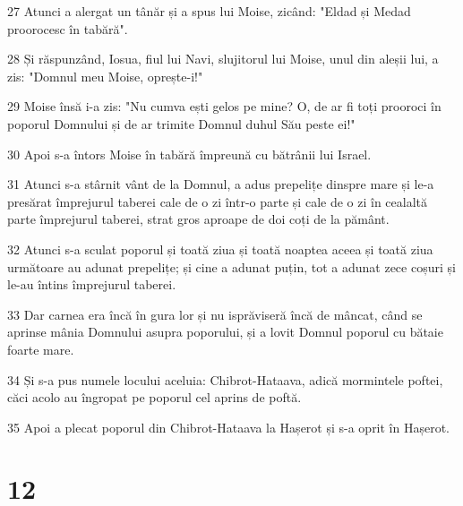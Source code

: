 \par 27 Atunci a alergat un tânăr și a spus lui Moise, zicând: "Eldad și Medad proorocesc în tabără".
\par 28 Și răspunzând, Iosua, fiul lui Navi, slujitorul lui Moise, unul din aleșii lui, a zis: "Domnul meu Moise, oprește-i!"
\par 29 Moise însă i-a zis: "Nu cumva ești gelos pe mine? O, de ar fi toți prooroci în poporul Domnului și de ar trimite Domnul duhul Său peste ei!"
\par 30 Apoi s-a întors Moise în tabără împreună cu bătrânii lui Israel.
\par 31 Atunci s-a stârnit vânt de la Domnul, a adus prepelițe dinspre mare și le-a presărat împrejurul taberei cale de o zi într-o parte și cale de o zi în cealaltă parte împrejurul taberei, strat gros aproape de doi coți de la pământ.
\par 32 Atunci s-a sculat poporul și toată ziua și toată noaptea aceea și toată ziua următoare au adunat prepelițe; și cine a adunat puțin, tot a adunat zece coșuri și le-au întins împrejurul taberei.
\par 33 Dar carnea era încă în gura lor și nu isprăviseră încă de mâncat, când se aprinse mânia Domnului asupra poporului, și a lovit Domnul poporul cu bătaie foarte mare.
\par 34 Și s-a pus numele locului aceluia: Chibrot-Hataava, adică mormintele poftei, căci acolo au îngropat pe poporul cel aprins de poftă.
\par 35 Apoi a plecat poporul din Chibrot-Hataava la Hașerot și s-a oprit în Hașerot.

\chapter{12}


